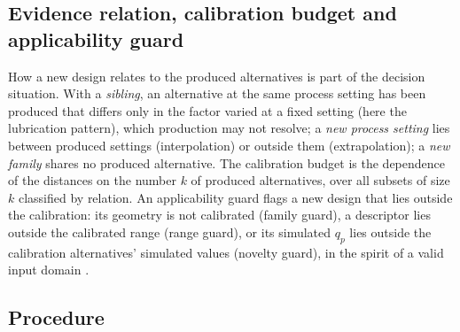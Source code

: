 \documentclass[pdflatex,sn-basic,lineno]{sn-jnl}
\begin{document}
\subsection{Evidence relation, calibration budget and applicability guard}\label{sec:budget}

How a new design relates to the produced alternatives is part of the decision situation. With a \emph{sibling}, an alternative at the same process setting has been produced that differs only in the factor varied at a fixed setting (here the lubrication pattern), which production may not resolve; a \emph{new process setting} lies between produced settings (interpolation) or outside them (extrapolation); a \emph{new family} shares no produced alternative. The calibration budget is the dependence of the distances on the number $k$ of produced alternatives, over all subsets of size $k$ classified by relation. An applicability guard flags a new design that lies outside the calibration: its geometry is not calibrated (family guard), a descriptor lies outside the calibrated range (range guard), or its simulated $q_p$ lies outside the calibration alternatives' simulated values (novelty guard), in the spirit of a valid input domain \citep{malak2010using}.

\subsection{Procedure}\label{sec:procedure}
\end{document}
